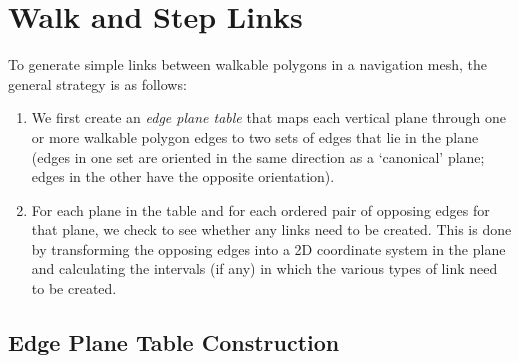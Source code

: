 \documentclass[10pt,twocolumn]{article}
\begin{document}
\section{Walk and Step Links}
\label{sec:walkstep}

To generate simple links between walkable polygons in a navigation mesh, the general strategy is as follows:
%
\begin{enumerate}
\item We first create an \emph{edge plane table} that maps each vertical plane through one or more walkable polygon edges to two sets of edges that lie in the plane (edges in one set are oriented in the same direction as a `canonical' plane; edges in the other have the opposite orientation).
\item For each plane in the table and for each ordered pair of opposing edges for that plane, we check to see whether any links need to be created. This is done by transforming the opposing edges into a 2D coordinate system in the plane and calculating the intervals (if any) in which the various types of link need to be created.
\end{enumerate}

\subsection{Edge Plane Table Construction}

\end{document}
